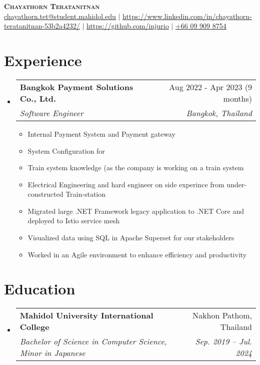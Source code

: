 \documentclass[letterpaper,11pt]{article}
\makeatletter
\newcommand{\resumeItem}[1]{
  \item\small{
    {#1 \vspace{-2pt}}
  }
}
\newcommand{\resumeSubheading}[4]{
  \vspace{-2pt}\item
    \begin{tabular*}{0.97\textwidth}[t]{l@{\extracolsep{\fill}}r}
      \textbf{#1} & #2 \\
      \textit{\small#3} & \textit{\small #4} \\
    \end{tabular*}\vspace{-7pt}
}
\newcommand{\resumeSubHeadingListStart}{\begin{itemize}[leftmargin=0.15in, label={}]}
\newcommand{\resumeSubHeadingListEnd}{\end{itemize}}
\newcommand{\resumeItemListStart}{\begin{itemize}}
\newcommand{\resumeItemListEnd}{\end{itemize}\vspace{-5pt}}
\makeatother
\begin{document}

\begin{center}
    \textbf{\Huge \scshape Chayathorn Teratanitnan} \\ \vspace{1pt}
    \footnotesize{
       \href{mailto:chayathorn.tet@student.mahidol.edu}{\underline{chayathorn.tet@student.mahidol.edu}} $|$ 
       \href{https://www.linkedin.com/in/chayathorn-teratanitnan-53b2a4232/}{\underline{https://www.linkedin.com/in/chayathorn-teratanitnan-53b2a4232/}} $|$ 
       \href{https://github.com/injurio}{\underline{https://github.com/injurio}} $|$
       {\underline{+66 09 909 8754}}
    }
\end{center}


\section{Experience}
  \resumeSubHeadingListStart
    \resumeSubheading
      {Bangkok Payment Solutions Co., Ltd.}{Aug 2022 - Apr 2023 (9 months)}
      {Software Engineer}{Bangkok, Thailand}
      \resumeItemListStart
        \resumeItem{Internal Payment System and Payment gateway}
        \resumeItem{System Configuration for }
        \resumeItem{Train system knowledge (as the company is working on a train system}
        \resumeItem{Electrical Engineering and hard engineer on side experince from under-constructed Train-station}
        \resumeItem{Migrated large .NET Framework legacy application to .NET Core and deployed to Istio service mesh}
        \resumeItem{Visualized data using SQL in Apache Superset for our stakeholders}
        \resumeItem{Worked in an Agile environment to enhance efficiency and productivity}
      \resumeItemListEnd
  \resumeSubHeadingListEnd


\section{Education}
  \resumeSubHeadingListStart
    \resumeSubheading
      {Mahidol University International College}{Nakhon Pathom, Thailand}
      {Bachelor of Science in Computer Science, Minor in Japanese}{Sep. 2019 -- Jul. 2024}
  \resumeSubHeadingListEnd
\end{document}
